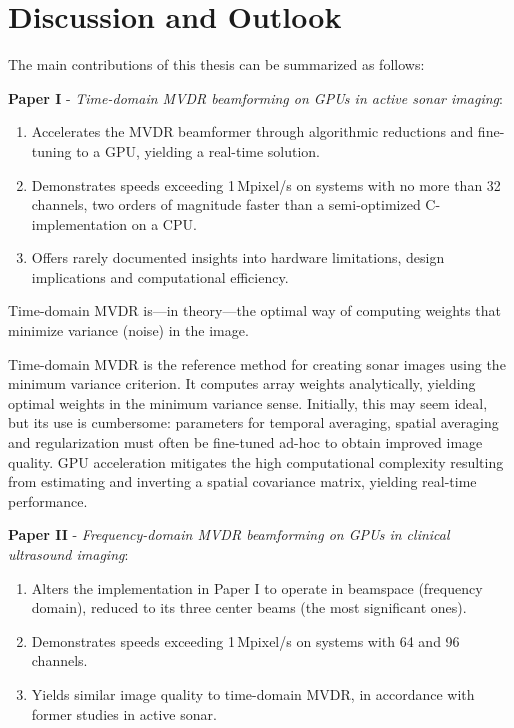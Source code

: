 
\endofdump

\ifRootBuild\else
  
  \makeglossaries
\fi



\chapter{Discussion and Outlook}

The main contributions of this thesis can be summarized as follows:

\textbf{Paper I} - \textit{Time-domain MVDR beamforming on GPUs in active sonar imaging}:
\begin{enumerate}
\item Accelerates the MVDR beamformer through algorithmic reductions and fine-tuning to a GPU, yielding a real-time solution.
\item Demonstrates speeds exceeding 1\,Mpixel/s on systems with no more than 32 channels, two orders of magnitude faster than a semi-optimized C-implementation on a CPU.
\item Offers rarely documented insights into hardware limitations, design implications and computational efficiency.
\end{enumerate}

Time-domain MVDR is---in theory---the optimal way of computing weights that minimize variance (noise) in the image. 

Time-domain MVDR is the reference method for creating sonar images using the minimum variance criterion. It computes array weights analytically, yielding optimal weights in the minimum variance sense. Initially, this may seem ideal, but its use is cumbersome: parameters for temporal averaging, spatial averaging and regularization must often be fine-tuned ad-hoc to obtain improved image quality. GPU acceleration mitigates the high computational complexity resulting from estimating and inverting a spatial covariance matrix, yielding real-time performance.


\textbf{Paper II} - \textit{Frequency-domain MVDR beamforming on GPUs in clinical ultrasound imaging}:
\begin{enumerate}
\item Alters the implementation in Paper I to operate in beamspace (frequency domain), reduced to its three center beams (the most significant ones).
\item Demonstrates speeds exceeding 1\,Mpixel/s on systems with 64 and 96 channels.
\item Yields similar image quality to time-domain MVDR, in accordance with former studies in active sonar.
\end{enumerate}

